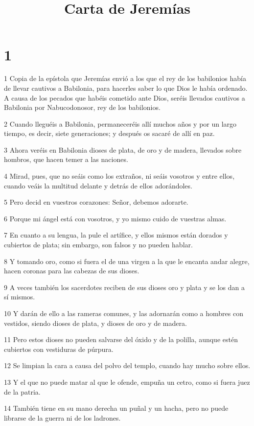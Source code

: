 

\title{Carta de Jeremías}

\chapter{1}


\par 1 Copia de la epístola que Jeremías envió a los que el rey de los babilonios había de llevar cautivos a Babilonia, para hacerles saber lo que Dios le había ordenado. A causa de los pecados que habéis cometido ante Dios, seréis llevados cautivos a Babilonia por Nabucodonosor, rey de los babilonios.
\par 2 Cuando lleguéis a Babilonia, permaneceréis allí muchos años y por un largo tiempo, es decir, siete generaciones; y después os sacaré de allí en paz.
\par 3 Ahora veréis en Babilonia dioses de plata, de oro y de madera, llevados sobre hombros, que hacen temer a las naciones.
\par 4 Mirad, pues, que no seáis como los extraños, ni seáis vosotros y entre ellos, cuando veáis la multitud delante y detrás de ellos adorándoles.
\par 5 Pero decid en vuestros corazones: Señor, debemos adorarte.
\par 6 Porque mi ángel está con vosotros, y yo mismo cuido de vuestras almas.
\par 7 En cuanto a su lengua, la pule el artífice, y ellos mismos están dorados y cubiertos de plata; sin embargo, son falsos y no pueden hablar.
\par 8 Y tomando oro, como si fuera el de una virgen a la que le encanta andar alegre, hacen coronas para las cabezas de sus dioses.
\par 9 A veces también los sacerdotes reciben de sus dioses oro y plata y se los dan a sí mismos.
\par 10 Y darán de ello a las rameras comunes, y las adornarán como a hombres con vestidos, siendo dioses de plata, y dioses de oro y de madera.
\par 11 Pero estos dioses no pueden salvarse del óxido y de la polilla, aunque estén cubiertos con vestiduras de púrpura.
\par 12 Se limpian la cara a causa del polvo del templo, cuando hay mucho sobre ellos.
\par 13 Y el que no puede matar al que le ofende, empuña un cetro, como si fuera juez de la patria.
\par 14 También tiene en su mano derecha un puñal y un hacha, pero no puede librarse de la guerra ni de los ladrones.
